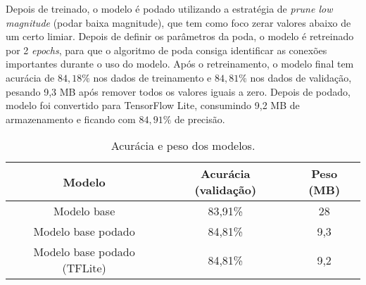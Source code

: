 Depois de treinado, o modelo é podado utilizando a estratégia de \textit{prune low magnitude} (podar baixa magnitude),
que tem como foco zerar valores abaixo de um certo limiar. Depois de definir os parâmetros da poda, o modelo é
retreinado por 2 \textit{epochs}, para que o algoritmo de poda consiga identificar as conexões importantes durante o
uso do modelo. Após o retreinamento, o modelo final tem acurácia de $84,18\%$ nos dados de treinamento e $84,81\%$
nos dados de validação, pesando 9,3 MB após remover todos os valores iguais a zero.
Depois de podado, modelo foi convertido para TensorFlow Lite, consumindo 9,2 MB de armazenamento e ficando com
$84,91\%$ de precisão.


\begin{center}
\begin{table}[htb]
\centering
\ABNTEXfontereduzida
\caption[Acurácia e peso dos modelos]{Acurácia e peso dos modelos.}
\label{tabela_acuracia_peso}
\begin{tabular}{ |c|c|c| }
	\hline
	\textbf{Modelo} & \textbf{Acurácia (validação)}  & \textbf{Peso (MB)} \\
	\hline
	Modelo base 			& 	83,91\% 	& 	28	\\
	Modelo base podado 		& 	84,81\% 	& 	9,3	\\
	Modelo base podado (TFLite) 	& 	84,81\% 	& 	9,2	\\
	\hline
\end{tabular}
\end{table}
\end{center}
